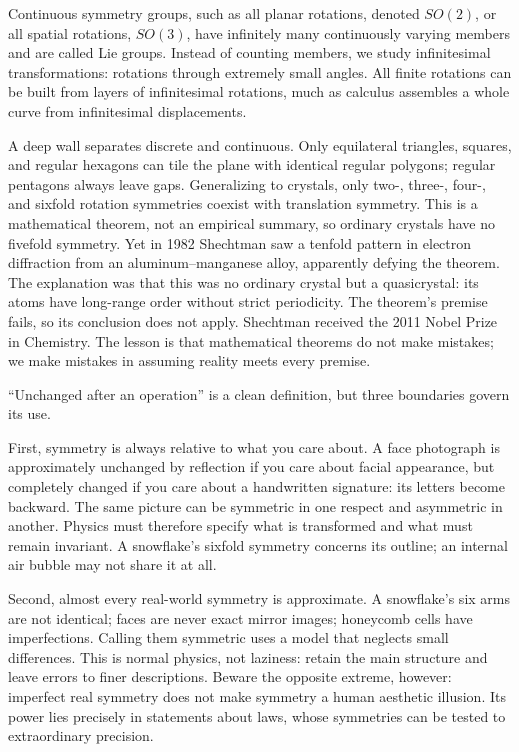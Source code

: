 \begin{challenge}
Continuous symmetry groups, such as all planar rotations, denoted \(SO(2)\), or all spatial rotations, \(SO(3)\), have infinitely many continuously varying members and are called Lie groups. Instead of counting members, we study infinitesimal transformations: rotations through extremely small angles. All finite rotations can be built from layers of infinitesimal rotations, much as calculus assembles a whole curve from infinitesimal displacements.

A deep wall separates discrete and continuous. Only equilateral triangles, squares, and regular hexagons can tile the plane with identical regular polygons; regular pentagons always leave gaps. Generalizing to crystals, only two-, three-, four-, and sixfold rotation symmetries coexist with translation symmetry. This is a mathematical theorem, not an empirical summary, so ordinary crystals have no fivefold symmetry. Yet in 1982 Shechtman saw a tenfold pattern in electron diffraction from an aluminum--manganese alloy, apparently defying the theorem. The explanation was that this was no ordinary crystal but a quasicrystal: its atoms have long-range order without strict periodicity. The theorem's premise fails, so its conclusion does not apply. Shechtman received the 2011 Nobel Prize in Chemistry. The lesson is that mathematical theorems do not make mistakes; we make mistakes in assuming reality meets every premise.
\end{challenge}


``Unchanged after an operation'' is a clean definition, but three boundaries govern its use.

First, symmetry is always relative to what you care about. A face photograph is approximately unchanged by reflection if you care about facial appearance, but completely changed if you care about a handwritten signature: its letters become backward. The same picture can be symmetric in one respect and asymmetric in another. Physics must therefore specify what is transformed and what must remain invariant. A snowflake's sixfold symmetry concerns its outline; an internal air bubble may not share it at all.

Second, almost every real-world symmetry is approximate. A snowflake's six arms are not identical; faces are never exact mirror images; honeycomb cells have imperfections. Calling them symmetric uses a model that neglects small differences. This is normal physics, not laziness: retain the main structure and leave errors to finer descriptions. Beware the opposite extreme, however: imperfect real symmetry does not make symmetry a human aesthetic illusion. Its power lies precisely in statements about laws, whose symmetries can be tested to extraordinary precision.

